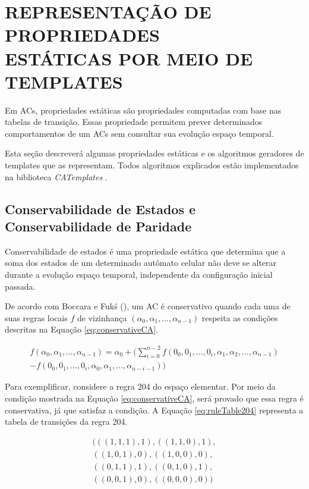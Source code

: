 \documentclass[12pt,a4paper]{article}
\let\stdsection\section
\renewcommand\section{\newpage\stdsection}
\begin{document}
\section[REPRESENTAÇÃO DE PROPRIEDADES ESTÁTICAS POR MEIO DE TEMPLATES]{REPRESENTAÇÃO DE PROPRIEDADES \\ ESTÁTICAS POR MEIO DE TEMPLATES}
\label{sec:propriedadesEstaticas}

	Em ACs, propriedades estáticas são propriedades computadas com base nas tabelas de transição. Essas propriedade permitem prever determinados comportamentos de um ACs sem consultar sua evolução espaço temporal. 

	Esta seção descreverá algumas propriedades estáticas e os algoritmos geradores de templates que as representam. Todos algoritmos explicados estão implementados na biblioteca \textit{CATemplates} \cite{CATemplates}.

	\subsection{Conservabilidade de Estados e Conservabilidade de Paridade}
	Conservabilidade de estados é uma propriedade estática que determina que a soma dos estados de um determinado autômato celular não deve se alterar durante a evolução espaço temporal, independente da configuração inicial passada.

	De acordo com Boccara e Fukś (\citeyear{boccara2002}), um AC é conservativo quando cada uma de suas regras locais $f$ de vizinhança $(\alpha_0,\alpha_1, \dots, \alpha_{n-1})$ respeita as condições descritas na Equação \ref{eq:conservativeCA}.

	\begin{equation}
	\begin{split}
	f(\alpha_0,\alpha_1, \dots,\alpha_{n-1}) = \alpha_0 + (\sum_{i=0}^{n-2}f(0_0,0_1, \dots,0_i,\alpha_1,\alpha_2, \dots,\alpha_{n-1}) \\- f(0_0,0_1, \dots,0_i,\alpha_0,\alpha_1, \dots,\alpha_{n-i-1}))
	\label{eq:conservativeCA}
	\end{split}
	\end{equation}

	Para exemplificar, considere a regra 204 do espaço elementar. Por meio da condição mostrada na Equação \ref{eq:conservativeCA}, será provado que essa regra é conservativa, já que satisfaz a condição. A Equação \ref{eq:ruleTable204} representa a tabela de transições da regra 204.

	\begin{equation}
	\begin{split}
	(((1,1,1),1),((1,1,0),1),\\((1,0,1),0),((1,0,0),0),\\((0,1,1),1),((0,1,0),1),\\((0,0,1),0),((0,0,0),0))
	\label{eq:ruleTable204}
	\end{split}
	\end{equation}
\end{document}
